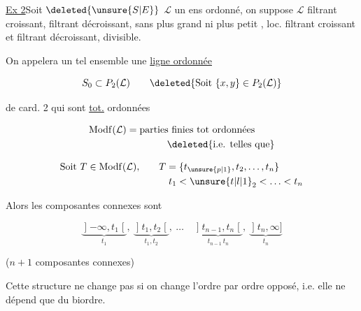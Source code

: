 
\uline{Ex 2}\quad Soit $\deleted{\unsure{S|E}}$ $\mathcal L$ un ens ordonné,
on suppose $\mathcal L$ filtrant croissant, filtrant
décroissant, sans plus grand ni
plus petit , loc. filtrant croissant
et filtrant décroissant, divisible.

On appelera un tel ensemble une
\uline{ligne ordonnée}

\[
S_0\subset P_2(\mathcal L)\qquad
\deleted{\text{Soit }\{x,y\}\in P_2(\mathcal L)}
\]

\textquotedbl\quad {}  de card. 2  qui sont \uline{tot.} ordonnées

\[
\begin{aligned}
&\mathrm{Modf}(\mathcal L)=\text{parties finies tot ordonnées}\\
&\hspace{8em}\deleted{\text{i.e. telles que}}
\end{aligned}
\]

\[
\begin{aligned}
 \text{Soit }T\in\mathrm{Modf}(\mathcal L),\qquad &T=\{t_{\unsure{p|1}},t_2,\ldots,t_{n}\}\\
 &\quad t_1<\unsure{t|l|1}_2<\ldots<t_n
\end{aligned}
\]

Alors les composantes connexes sont

\[
\underbrace{\mathopen{]}-\infty,t_1\mathclose{[}}_{t_1},\
\underbrace{\mathopen{]}t_1,t_2\mathclose{[}}_{t_1,t_2},\
\ldots\quad
\underbrace{\mathopen{]}t_{n-1},t_n\mathclose{[}}_{t_{n-1}\,t_n},\
\underbrace{\mathopen{]}t_n,\infty\mathclose{]}}_{t_n}
\]


($n+1$ composantes connexes)

\mspage{7}

Cette structure ne change pas si
on change l'ordre par ordre opposé,
i.e. elle ne dépend que du
biordre.

 


